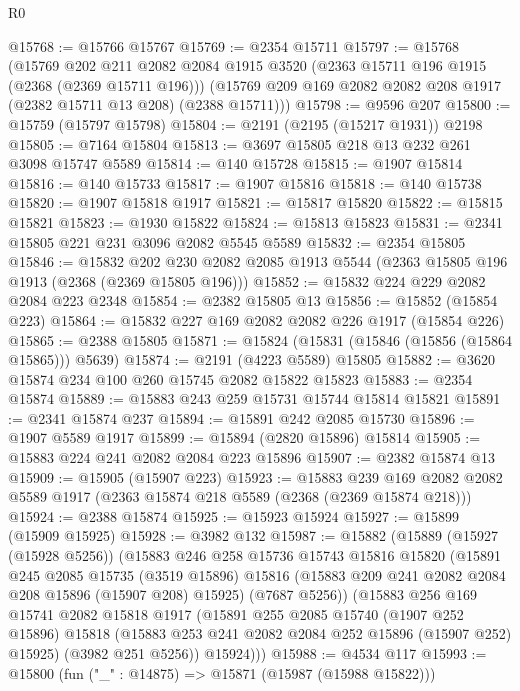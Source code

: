 \begin{lexlean}{R0}
\begin{coremodule}
@15768 := @15766 @15767
@15769 := @2354 @15711
@15797 := @15768
    (@15769
      @202
      @211
      @2082
      @2084
      @1915
      @3520
      (@2363 @15711 @196 @1915 (@2368 (@2369 @15711 @196)))
      (@15769 @209 @169 @2082 @2082 @208 @1917 (@2382 @15711 @13 @208) (@2388 @15711)))
@15798 := @9596 @207
@15800 := @15759 (@15797 @15798)
@15804 := @2191 (@2195 (@15217 @1931)) @2198
@15805 := @7164 @15804
@15813 := @3697 @15805 @218 @13 @232 @261 @3098 @15747 @5589
@15814 := @140 @15728
@15815 := @1907 @15814
@15816 := @140 @15733
@15817 := @1907 @15816
@15818 := @140 @15738
@15820 := @1907 @15818 @1917
@15821 := @15817 @15820
@15822 := @15815 @15821
@15823 := @1930 @15822
@15824 := @15813 @15823
@15831 := @2341 @15805 @221 @231 @3096 @2082 @5545 @5589
@15832 := @2354 @15805
@15846 := @15832
    @202
    @230
    @2082
    @2085
    @1913
    @5544
    (@2363 @15805 @196 @1913 (@2368 (@2369 @15805 @196)))
@15852 := @15832 @224 @229 @2082 @2084 @223 @2348
@15854 := @2382 @15805 @13
@15856 := @15852 (@15854 @223)
@15864 := @15832 @227 @169 @2082 @2082 @226 @1917 (@15854 @226)
@15865 := @2388 @15805
@15871 := @15824 (@15831 (@15846 (@15856 (@15864 @15865))) @5639)
@15874 := @2191 (@4223 @5589) @15805
@15882 := @3620 @15874 @234 @100 @260 @15745 @2082 @15822 @15823
@15883 := @2354 @15874
@15889 := @15883 @243 @259 @15731 @15744 @15814 @15821
@15891 := @2341 @15874 @237
@15894 := @15891 @242 @2085 @15730
@15896 := @1907 @5589 @1917
@15899 := @15894 (@2820 @15896) @15814
@15905 := @15883 @224 @241 @2082 @2084 @223 @15896
@15907 := @2382 @15874 @13
@15909 := @15905 (@15907 @223)
@15923 := @15883
    @239
    @169
    @2082
    @2082
    @5589
    @1917
    (@2363 @15874 @218 @5589 (@2368 (@2369 @15874 @218)))
@15924 := @2388 @15874
@15925 := @15923 @15924
@15927 := @15899 (@15909 @15925)
@15928 := @3982 @132
@15987 := @15882
    (@15889
      (@15927 (@15928 @5256))
      (@15883
        @246
        @258
        @15736
        @15743
        @15816
        @15820
        (@15891
          @245
          @2085
          @15735
          (@3519 @15896)
          @15816
          (@15883 @209 @241 @2082 @2084 @208 @15896 (@15907 @208) @15925)
          (@7687 @5256))
        (@15883
          @256
          @169
          @15741
          @2082
          @15818
          @1917
          (@15891
            @255
            @2085
            @15740
            (@1907 @252 @15896)
            @15818
            (@15883 @253 @241 @2082 @2084 @252 @15896 (@15907 @252) @15925)
            (@3982 @251 @5256))
          @15924)))
@15988 := @4534 @117
@15993 := @15800 (fun ("_" : @14875) => @15871 (@15987 (@15988 @15822)))

\end{coremodule}
\end{lexlean}
